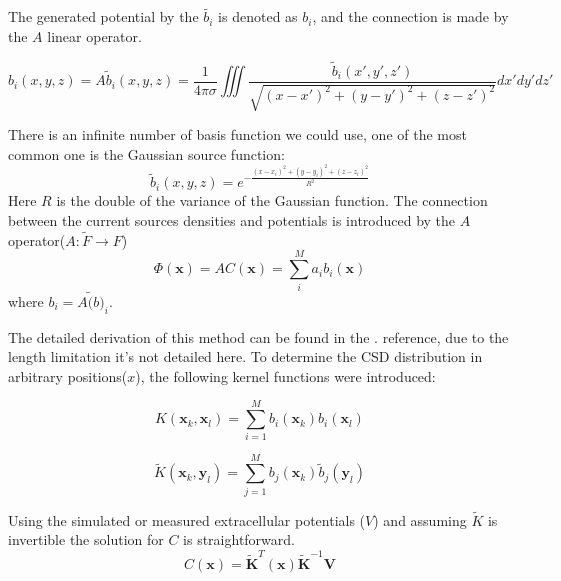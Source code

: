 \documentclass[12pt,a4paper]{article}
\begin{document}
The generated potential by the $\tilde{b_i}$ is denoted as  $b_i$, and the connection is made by the $A$ linear operator.

\begin{equation}
\label{eq:bfun}
b_i (x,y,z)= A \tilde{b}_i (x,y,z)= \frac{1}{4 \pi \sigma} \iiint 
\frac{ \tilde{b}_i (x',y',z')}{\sqrt{(x-x')^2+(y-y')^2+(z-z')^2}} dx' dy' dz'
\end{equation}

There is an infinite number of basis function we could use, one of the most common one is the Gaussian source function:
\begin{equation}
\label{eq:basisfun}
\tilde{b}_i (x,y,z) = e^{- \frac{(x-x_i)^2+(y-y_i)^2+(z-z_i)^2}{R^2}}
\end{equation}
Here $R$ is the double of the variance of the Gaussian function. The connection between the current sources densities and potentials is introduced by the $A$ operator($A: \tilde{F}\rightarrow F$)
\begin{equation}
\Phi(\textbf{x})= A C(\textbf{x}) =  \sum_{i}^M a_i b_i (\textbf{x})
\end{equation}
 where $b_i = A \tilde(b)_i$.
 
 
 
 
 
The detailed derivation of this method can be found in the \cite{DanielW}. reference, due to the length limitation it's not detailed here.
To determine the CSD distribution in arbitrary positions($x$), the following kernel functions were introduced:

\begin{equation}
K(\textbf{x}_k,\textbf{x}_l)= \sum_{i=1}^M b_i (\textbf{x}_k) b_i (\textbf{x}_l)
\end{equation} 
 
\begin{equation}
\tilde{K}(\textbf{x}_k,\textbf{y}_l)= \sum_{j=1}^M b_j (\textbf{x}_k) \tilde{b}_j (\textbf{y}_l) 
\end{equation} 
 
Using the simulated or measured extracellular potentials ($V$) and assuming $\tilde{K}$ is invertible the solution for $C$ is straightforward.
 \begin{equation}
 C(\textbf{x})=\tilde{\textbf{K}}^T(\textbf{x})  
 \tilde{\textbf{K}}^{-1} \textbf{V}
 \end{equation}
\end{document}
